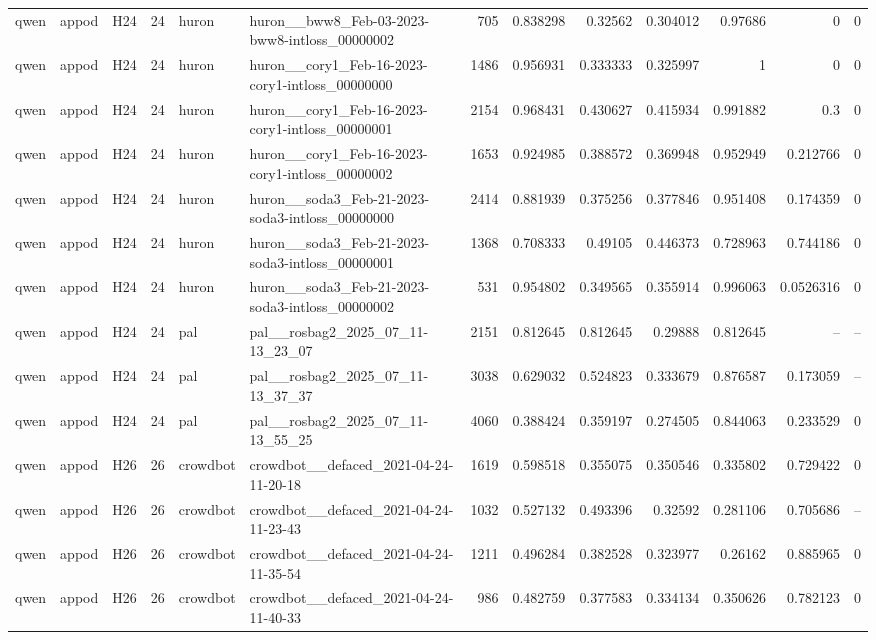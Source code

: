 \begin{longtable}{lllrllrrrrrrr}
qwen & appod & H24 & 24 & huron & huron\_\_bww8\_Feb-03-2023-bww8-intloss\_00000002 & 705 & 0.838298 & 0.32562 & 0.304012 & 0.97686 & 0 & 0 \\
qwen & appod & H24 & 24 & huron & huron\_\_cory1\_Feb-16-2023-cory1-intloss\_00000000 & 1486 & 0.956931 & 0.333333 & 0.325997 & 1 & 0 & 0 \\
qwen & appod & H24 & 24 & huron & huron\_\_cory1\_Feb-16-2023-cory1-intloss\_00000001 & 2154 & 0.968431 & 0.430627 & 0.415934 & 0.991882 & 0.3 & 0 \\
qwen & appod & H24 & 24 & huron & huron\_\_cory1\_Feb-16-2023-cory1-intloss\_00000002 & 1653 & 0.924985 & 0.388572 & 0.369948 & 0.952949 & 0.212766 & 0 \\
qwen & appod & H24 & 24 & huron & huron\_\_soda3\_Feb-21-2023-soda3-intloss\_00000000 & 2414 & 0.881939 & 0.375256 & 0.377846 & 0.951408 & 0.174359 & 0 \\
qwen & appod & H24 & 24 & huron & huron\_\_soda3\_Feb-21-2023-soda3-intloss\_00000001 & 1368 & 0.708333 & 0.49105 & 0.446373 & 0.728963 & 0.744186 & 0 \\
qwen & appod & H24 & 24 & huron & huron\_\_soda3\_Feb-21-2023-soda3-intloss\_00000002 & 531 & 0.954802 & 0.349565 & 0.355914 & 0.996063 & 0.0526316 & 0 \\
qwen & appod & H24 & 24 & pal & pal\_\_rosbag2\_2025\_07\_11-13\_23\_07 & 2151 & 0.812645 & 0.812645 & 0.29888 & 0.812645 & -- & -- \\
qwen & appod & H24 & 24 & pal & pal\_\_rosbag2\_2025\_07\_11-13\_37\_37 & 3038 & 0.629032 & 0.524823 & 0.333679 & 0.876587 & 0.173059 & -- \\
qwen & appod & H24 & 24 & pal & pal\_\_rosbag2\_2025\_07\_11-13\_55\_25 & 4060 & 0.388424 & 0.359197 & 0.274505 & 0.844063 & 0.233529 & 0 \\
qwen & appod & H26 & 26 & crowdbot & crowdbot\_\_defaced\_2021-04-24-11-20-18 & 1619 & 0.598518 & 0.355075 & 0.350546 & 0.335802 & 0.729422 & 0 \\
qwen & appod & H26 & 26 & crowdbot & crowdbot\_\_defaced\_2021-04-24-11-23-43 & 1032 & 0.527132 & 0.493396 & 0.32592 & 0.281106 & 0.705686 & -- \\
qwen & appod & H26 & 26 & crowdbot & crowdbot\_\_defaced\_2021-04-24-11-35-54 & 1211 & 0.496284 & 0.382528 & 0.323977 & 0.26162 & 0.885965 & 0 \\
qwen & appod & H26 & 26 & crowdbot & crowdbot\_\_defaced\_2021-04-24-11-40-33 & 986 & 0.482759 & 0.377583 & 0.334134 & 0.350626 & 0.782123 & 0 \\

\end{longtable}

